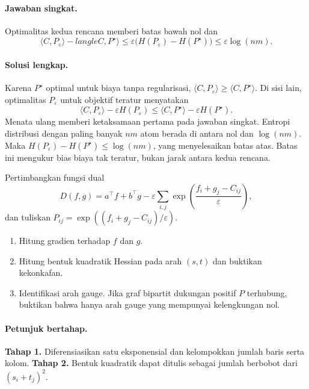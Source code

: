 \paragraph{Jawaban singkat.}
\label{orig03:ps06:answer:0004}
Optimalitas kedua rencana memberi batas bawah nol dan
\[
 \langle C,P_\varepsilon\rangle-langle C,P^\star\rangle
 \le\varepsilon\bigl(H(P_\varepsilon)-H(P^\star)\bigr)
 \le\varepsilon\log(nm).
\]

\paragraph{Solusi lengkap.}
\label{orig03:ps06:solution:0004}
Karena $P^\star$ optimal untuk biaya tanpa regularisasi,
$\langle C,P_\varepsilon\rangle\ge\langle C,P^\star\rangle$. Di sisi lain,
optimalitas $P_\varepsilon$ untuk objektif teratur menyatakan
\[
 \langle C,P_\varepsilon\rangle-\varepsilon H(P_\varepsilon)
 \le\langle C,P^\star\rangle-\varepsilon H(P^\star).
\]
Menata ulang memberi ketaksamaan pertama pada jawaban singkat. Entropi
distribusi dengan paling banyak $nm$ atom berada di antara nol dan
$\log(nm)$. Maka
$H(P_\varepsilon)-H(P^\star)\le\log(nm)$, yang menyelesaikan batas atas.
Batas ini mengukur bias biaya tak teratur, bukan jarak antara kedua rencana.

\begin{exercise}
\label{orig03:ps06:exercise:0005}
Pertimbangkan fungsi dual
\[
 D(f,g)=a^\top f+b^\top g
 -\varepsilon\sum_{i,j}
 \exp\!\left(\frac{f_i+g_j-C_{ij}}{\varepsilon}\right),
\]
dan tuliskan
$P_{ij}=\exp((f_i+g_j-C_{ij})/\varepsilon)$.

\begin{enumerate}
  \item Hitung gradien terhadap $f$ dan $g$.
  \item Hitung bentuk kuadratik Hessian pada arah $(s,t)$ dan buktikan
  kekonkafan.
  \item Identifikasi arah gauge. Jika graf bipartit dukungan positif $P$
  terhubung, buktikan bahwa hanya arah gauge yang mempunyai kelengkungan nol.
\end{enumerate}
\end{exercise}

\paragraph{Petunjuk bertahap.}
\label{orig03:ps06:hint:0005}
\textbf{Tahap 1.} Diferensiasikan satu eksponensial dan kelompokkan jumlah
baris serta kolom.
\textbf{Tahap 2.} Bentuk kuadratik dapat ditulis sebagai jumlah berbobot dari
$(s_i+t_j)^2$.


